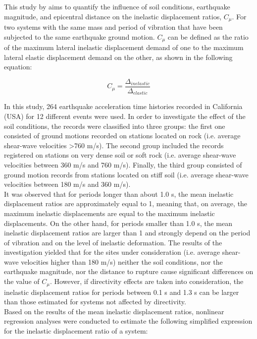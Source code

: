 This study by \cite{Miranda2000} aims to quantify the influence of soil conditions, earthquake magnitude, and epicentral distance on the inelastic displacement ratios, $C_\mu$. For two systems with the same mass and period of vibration that have been subjected to the same earthquake ground motion. $C_\mu$ can be defined as the ratio of the maximum lateral inelastic displacement demand of one to the maximum lateral elastic displacement demand on the other, as shown in the following equation:

\begin{equation}
C_\mu = \frac{\Delta_{inelastic}}{\Delta_{elastic}}
\end{equation}

In this study, 264 earthquake acceleration time histories recorded in California (USA) for 12 different events were used. In order to investigate the effect of the soil conditions, the records were classified into three groups: the first one consisted of ground motions recorded on stations located on rock (i.e. average shear-wave velocities >760 m/s). The second group included the records registered on stations on very dense soil or soft rock (i.e. average shear-wave velocities between 360 m/s and 760 m/s). Finally, the third group consisted of ground motion records from stations located on stiff soil (i.e. average shear-wave velocities between 180 m/s and 360 m/s).\\
It was observed that for periods longer than about 1.0 s, the mean inelastic displacement ratios are approximately equal to 1, meaning that, on average, the maximum inelastic displacements are equal to the maximum inelastic displacements. On the other hand, for periods smaller than 1.0 s, the mean inelastic displacement ratios are larger than 1 and strongly depend on the period of vibration and on the level of inelastic deformation.
The results of the investigation yielded that for the sites under consideration (i.e. average shear-wave velocities higher than 180 m/s) neither the soil conditions, nor the earthquake magnitude, nor the distance to rupture cause significant differences on the value of $C_\mu$. However, if directivity effects are taken into consideration, the inelastic displacement ratios for periods between 0.1 s and 1.3 s can be larger than those estimated for systems not affected by directivity.\\

Based on the results of the mean inelastic displacement ratios, nonlinear regression analyses were conducted to estimate the following simplified expression for the inelastic displacement ratio of a system:

